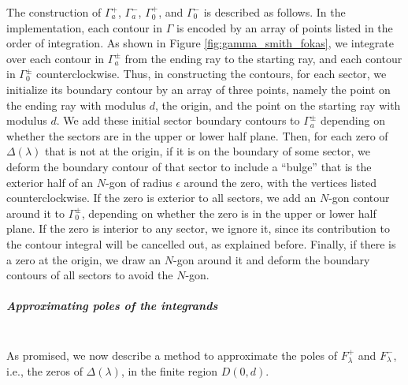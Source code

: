 \documentclass[12pt, oneside, a4paper]{article}
\begin{document}
The construction of $\Gamma_a^+$, $\Gamma_a^-$, $\Gamma_0^+$, and $\Gamma_0^-$ is described as follows. In the implementation, each contour in $\Gamma$ is encoded by an array of points listed in the order of integration. As shown in Figure \ref{fig:gamma_smith_fokas}, we integrate over each contour in $\Gamma_a^\pm$ from the ending ray to the starting ray, and each contour in $\Gamma_0^\pm$ counterclockwise. Thus, in constructing the contours, for each sector, we initialize its boundary contour by an array of three points, namely the point on the ending ray with modulus $d$, the origin, and the point on the starting ray with modulus $d$. We add these initial sector boundary contours to $\Gamma_a^\pm$ depending on whether the sectors are in the upper or lower half plane. Then, for each zero of $\Delta(\lambda)$ that is not at the origin, if it is on the boundary of some sector, we deform the boundary contour of that sector to include a ``bulge'' that is the exterior half of an $N$-gon of radius $\epsilon$ around the zero, with the vertices listed counterclockwise. If the zero is exterior to all sectors, we add an $N$-gon contour around it to $\Gamma_0^{\pm}$, depending on whether the zero is in the upper or lower half plane. If the zero is interior to any sector, we ignore it, since its contribution to the contour integral will be cancelled out, as explained before. Finally, if there is a zero at the origin, we draw an $N$-gon around it and deform the boundary contours of all sectors to avoid the $N$-gon. 

\noindent\subparagraph{Approximating poles of the integrands}\mbox{}\label{par:approximating_integrand_poles}\\
As promised, we now describe a method to approximate the poles of $F^+_\lambda$ and $F^-_\lambda$, i.e., the zeros of $\Delta(\lambda)$, in the finite region $D(0,d)$.
\end{document}
